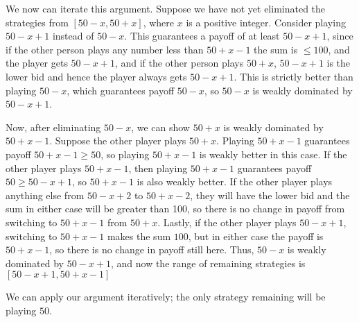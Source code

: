 \documentclass[10pt,letter]{article}
\begin{document}
We now can iterate this argument. Suppose we have not yet eliminated the strategies from $[50 - x, 50 + x]$, where $x$ is a positive integer. Consider playing $50 - x + 1$ instead of $50 - x$. This guarantees a payoff of at least $50 - x + 1$, since if the other person plays any number less than $50 + x - 1$ the sum is $\le 100$, and the player gets $50 - x + 1$, and if the other person plays $50 + x$, $50 -x + 1$ is the lower bid and hence the player always gets $50 - x + 1$. This is strictly better than playing $50 - x$, which guarantees payoff $50 - x$, so $50 - x$ is weakly dominated by $50 - x + 1$.

Now, after eliminating $50 - x$, we can show $50 + x$ is weakly dominated by $50 + x - 1$. Suppose the other player plays $50 + x$. Playing $50 + x - 1$ guarantees payoff $50 + x - 1 \ge 50$, so playing $50  + x - 1$ is weakly better  in this case. If  the other player plays $50 + x - 1$, then playing $50 + x - 1$ guarantees payoff $50 \ge 50 - x + 1$, so $50 + x - 1$ is also weakly better. If the other player plays anything else from $50 - x + 2$ to $50 + x - 2$, they will have the lower bid and the sum in either case will be greater than 100, so there is no change in payoff from switching to $50 + x - 1$ from $50 + x$.
Lastly, if the other player plays $50 - x + 1$, switching to $50 + x - 1$ makes the sum $100$, but in either case the payoff is $50 + x - 1$, so there is no change in payoff still here. Thus, $50 - x$ is weakly  dominated by $50 - x + 1$, and now the range of remaining strategies is $[50 - x + 1, 50 + x - 1]$

We can apply our argument iteratively; the only strategy remaining will be playing $50$.
\end{document}
